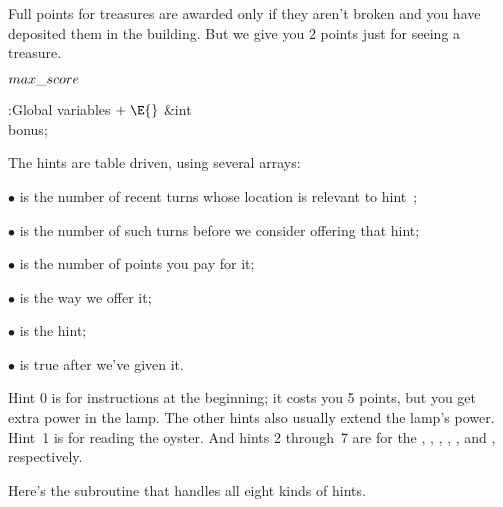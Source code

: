 Full points for treasures are awarded only if they aren't broken and
you have deposited them in the building. But we give you 2 points just for
seeing a treasure.

\Y\B\4\D$\\{max\_score}$ \5
\par
\Y\B\4:Global variables\X${}\mathrel+\E{}$\6
\&{int} \\{bonus};%
\par
\fi

The hints are table driven, using several arrays:

\item{$\bullet$} 
is the number of recent turns whose location is relevant to hint~;

\item{$\bullet$}  is the number of such turns before
we consider offering that hint;

\item{$\bullet$}  is the number of points you pay for
it;

\item{$\bullet$}  is the way we offer it;

\item{$\bullet$}  is the hint;

\item{$\bullet$}  is true after we've given it.

\medskip\noindent
Hint 0 is for instructions at the beginning; it costs you 5 points, but
you get extra power in the lamp. The other hints also usually extend the lamp's
power. Hint~1 is for reading the oyster. And hints 2 through~7 are for the
, , , , ,
and , respectively.

Here's the subroutine that handles all eight kinds of hints.

